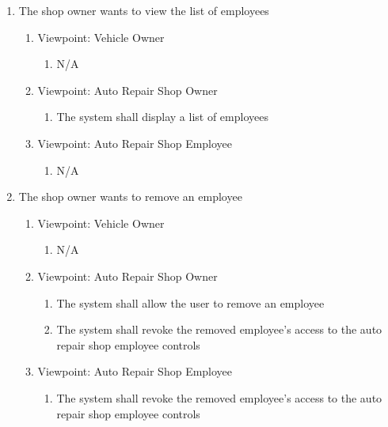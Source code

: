\documentclass[12pt]{article}
\begin{document}
\begin{enumerate}[resume*=business_events]
	\item The shop owner wants to view the list of employees
	      \begin{enumerate}[VP\arabic*.]
		      \item Viewpoint: Vehicle Owner
		            \begin{enumerate}
			            \item[] N/A
		            \end{enumerate}
		      \item Viewpoint: Auto Repair Shop Owner
		            \begin{enumerate}
			            \item The system shall display a list of employees
		            \end{enumerate}
		      \item Viewpoint: Auto Repair Shop Employee
		            \begin{enumerate}
			            \item[] N/A
		            \end{enumerate}
	      \end{enumerate}

	\item The shop owner wants to remove an employee
	      \begin{enumerate}[VP\arabic*.]
		      \item Viewpoint: Vehicle Owner
		            \begin{enumerate}
			            \item[] N/A
		            \end{enumerate}
		      \item Viewpoint: Auto Repair Shop Owner
		            \begin{enumerate}
			            \item The system shall allow the user to remove an employee
			            \item The system shall revoke the removed employee's access to the auto repair shop employee controls
		            \end{enumerate}
		      \item Viewpoint: Auto Repair Shop Employee
		            \begin{enumerate}
			            \item The system shall revoke the removed employee's access to the auto repair shop employee controls
		            \end{enumerate}
	      \end{enumerate}
\end{enumerate}
\end{document}
